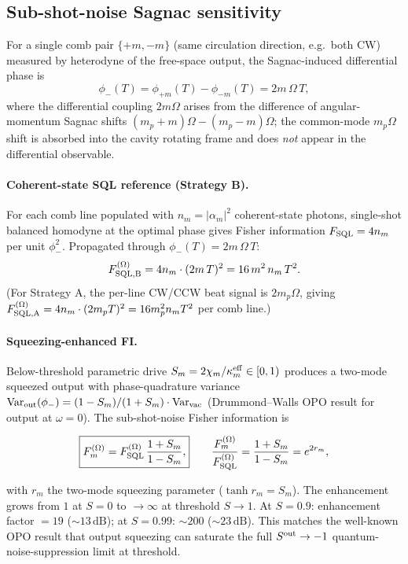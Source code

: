\documentclass[11pt]{article}
\newcommand{\eff}{{\rm eff}}
\begin{document}
\subsection{Sub-shot-noise Sagnac sensitivity}
\label{sec:subSNL}

For a single comb pair $\{+m,-m\}$ (same circulation direction, e.g.\
both CW) measured by heterodyne of the free-space output, the
Sagnac-induced differential phase is
\begin{equation}
  \phi_-(T) = \phi_{+m}(T) - \phi_{-m}(T) = 2m\,\Omega\,T,
\end{equation}
where the differential coupling $2m\Omega$ arises from the difference
of angular-momentum Sagnac shifts $(m_p+m)\Omega - (m_p-m)\Omega$; the
common-mode $m_p\Omega$ shift is absorbed into the cavity rotating
frame and does \emph{not} appear in the differential observable.

\paragraph{Coherent-state SQL reference (Strategy B).}  For each comb
line populated with $n_m = |\alpha_m|^2$ coherent-state photons,
single-shot balanced homodyne at the optimal phase gives Fisher
information $F_{\rm SQL} = 4 n_m$ per unit $\phi_-^2$.  Propagated
through $\phi_-(T) = 2m\,\Omega\,T$:
\begin{equation}
  F_{\rm SQL,B}^{(\Omega)} = 4 n_m \cdot (2m\,T)^2
  = 16\, m^2\,n_m\,T^2.
  \label{eq:F_SQL}
\end{equation}
(For Strategy A, the per-line CW/CCW beat signal is $2m_p\Omega$,
giving $F_{\rm SQL,A}^{(\Omega)} = 4n_m\cdot(2m_p T)^2 = 16 m_p^2 n_m T^2$
per comb line.)

\paragraph{Squeezing-enhanced FI.}  Below-threshold parametric drive
$S_m = 2\chi_m/\kappa_m^\eff \in [0,1)$ produces a two-mode squeezed
output with phase-quadrature variance
$\mathrm{Var}_{\rm out}(\phi_-) = (1-S_m)/(1+S_m)\cdot\mathrm{Var}_{\rm vac}$
(Drummond--Walls OPO result for output at $\omega=0$).  The
sub-shot-noise Fisher information is
\begin{keyresult}
\begin{equation}
  \boxed{
  F_m^{(\Omega)} = F_{\rm SQL}^{(\Omega)}\,\frac{1+S_m}{1-S_m},}
  \qquad \frac{F_m^{(\Omega)}}{F_{\rm SQL}^{(\Omega)}} = \frac{1+S_m}{1-S_m}
  = e^{2r_m},
  \label{eq:F_enhanced}
\end{equation}
\end{keyresult}
with $r_m$ the two-mode squeezing parameter ($\tanh r_m = S_m$).  The
enhancement grows from $1$ at $S=0$ to $\to\infty$ at threshold
$S\to 1$.  At $S=0.9$: enhancement factor $=19$ ($\sim 13\,\mathrm{dB}$);
at $S=0.99$: $\sim 200$ ($\sim 23\,\mathrm{dB}$).  This matches the
well-known OPO result that output squeezing can saturate the full
$S^{\rm out}\to-1$ quantum-noise-suppression limit at threshold.
\end{document}
